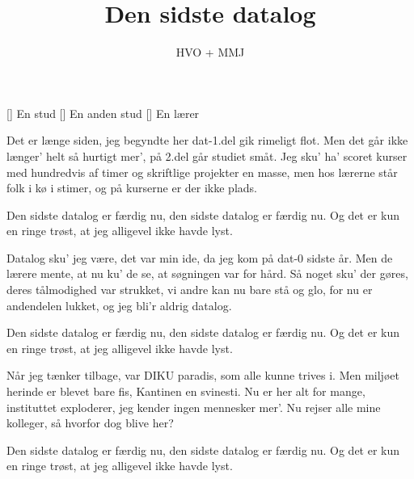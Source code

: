\documentclass[a4paper,11pt]{article}
\title{Den sidste datalog}
\author{HVO + MMJ}
\begin{document}
\maketitle

\begin{roles}
[] En stud
[] En anden stud
[] En lærer
\end{roles}

\begin{song}
     Det er længe siden, jeg begyndte her
              dat-1.del gik rimeligt flot.
              Men det går ikke længer' helt så hurtigt mer',
              på 2.del går studiet småt.
              Jeg sku' ha' scoret kurser med hundredvis af timer
              og skriftlige projekter en masse,
              men hos lærerne står folk i kø i stimer,
              og på kurserne er der ikke plads.

     Den sidste datalog er færdig nu,
              den sidste datalog er færdig nu.
              Og det er kun en ringe trøst,
              at jeg alligevel ikke havde lyst.

     Datalog sku' jeg være, det var min ide,
              da jeg kom på dat-0 sidste år.
              Men de lærere mente, at nu ku' de se,
              at søgningen var for hård.
              Så noget sku' der gøres, deres tålmodighed var strukket,
              vi andre kan nu bare stå og glo,
              for nu er andendelen lukket,
              og jeg bli'r aldrig datalog.

     Den sidste datalog er færdig nu,
              den sidste datalog er færdig nu.
              Og det er kun en ringe trøst,
              at jeg alligevel ikke havde lyst.

     Når jeg tænker tilbage, var DIKU paradis,
              som alle kunne trives i.
              Men miljøet herinde er blevet bare fis,
              Kantinen en svinesti.
              Nu er her alt for mange, instituttet exploderer,
              jeg kender ingen mennesker mer'.
              Nu rejser alle mine kolleger, så hvorfor dog blive her?

     Den sidste datalog er færdig nu,
              den sidste datalog er færdig nu.
              Og det er kun en ringe trøst,
              at jeg alligevel ikke havde lyst.

\end{song}
\end{document}
